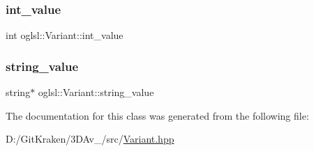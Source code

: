 \subsubsection{\texorpdfstring{int\+\_\+value}{int\_value}}
{\footnotesize\ttfamily int oglsl\+::\+Variant\+::int\+\_\+value}

\mbox{\label{classoglsl_1_1_variant_a0ff2ca502e6648771791112bb2ec78be}} 
\subsubsection{\texorpdfstring{string\+\_\+value}{string\_value}}
{\footnotesize\ttfamily string$\ast$ oglsl\+::\+Variant\+::string\+\_\+value}



The documentation for this class was generated from the following file\+:\begin{DoxyCompactItemize}
\item 
D\+:/\+Git\+Kraken/3\+D\+Av\+\_/src/\mbox{\hyperlink{_variant_8hpp}{Variant.\+hpp}}\end{DoxyCompactItemize}
